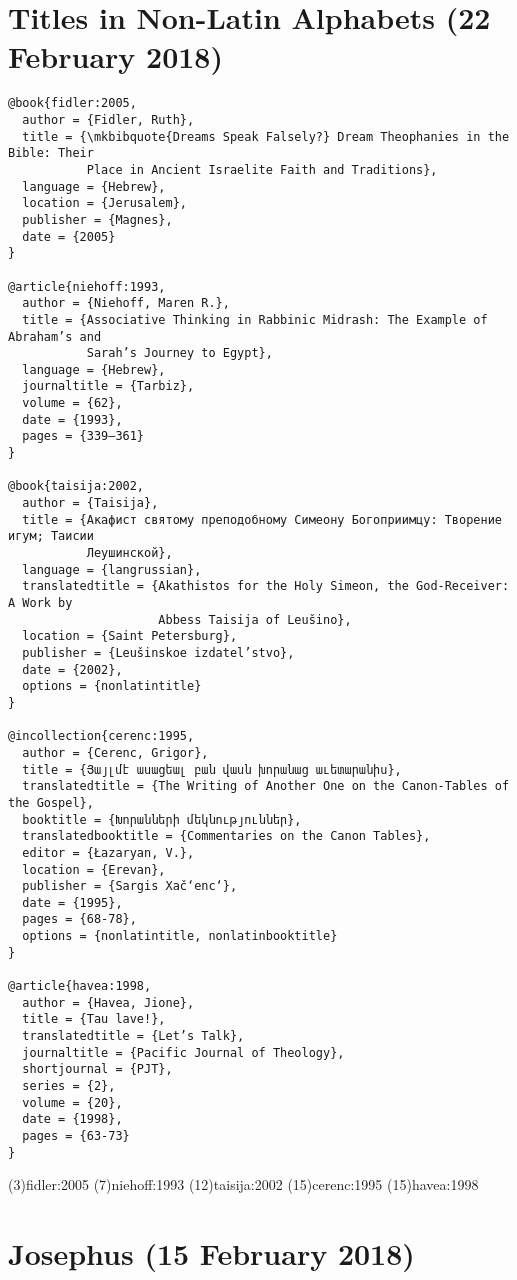 \documentclass[a4paper]{article}
\begin{document}
\section{Titles in Non-Latin Alphabets (22 February 2018)}

\begin{verbatim}
@book{fidler:2005,
  author = {Fidler, Ruth},
  title = {\mkbibquote{Dreams Speak Falsely?} Dream Theophanies in the Bible: Their
           Place in Ancient Israelite Faith and Traditions},
  language = {Hebrew},
  location = {Jerusalem},
  publisher = {Magnes},
  date = {2005}
}

@article{niehoff:1993,
  author = {Niehoff, Maren R.},
  title = {Associative Thinking in Rabbinic Midrash: The Example of Abraham’s and
           Sarah’s Journey to Egypt},
  language = {Hebrew},
  journaltitle = {Tarbiz},
  volume = {62},
  date = {1993},
  pages = {339–361}
}

@book{taisija:2002,
  author = {Taisija},
  title = {Акафист святому преподобному Симеону Богоприимцу: Творение игум; Таисии
           Леушинской},
  language = {langrussian},
  translatedtitle = {Akathistos for the Holy Simeon, the God-Receiver: A Work by
                     Abbess Taisija of Leušino},
  location = {Saint Petersburg},
  publisher = {Leušinskoe izdatel’stvo},
  date = {2002},
  options = {nonlatintitle}
}

@incollection{cerenc:1995,
  author = {Cerenc, Grigor},
  title = {Յայլմէ ասացեալ բան վասն խորանաց աւետարանիս},
  translatedtitle = {The Writing of Another One on the Canon-Tables of the Gospel},
  booktitle = {Խորանների մեկնություններ},
  translatedbooktitle = {Commentaries on the Canon Tables},
  editor = {Łazaryan, V.},
  location = {Erevan},
  publisher = {Sargis Xač‘enc‘},
  date = {1995},
  pages = {68-78},
  options = {nonlatintitle, nonlatinbooktitle}
}

@article{havea:1998,
  author = {Havea, Jione},
  title = {Tau lave!},
  translatedtitle = {Let’s Talk},
  journaltitle = {Pacific Journal of Theology},
  shortjournal = {PJT},
  series = {2},
  volume = {20},
  date = {1998},
  pages = {63-73}
}
\end{verbatim}

\examplecite(3){fidler:2005}
\examplecite(7){niehoff:1993}
\examplecite(12){taisija:2002}
\examplecite(15){cerenc:1995}
\examplecite(15){havea:1998}
\exampleabbreviations
\examplebibliography
{}

\section{Josephus (15 February 2018)}
\end{document}
